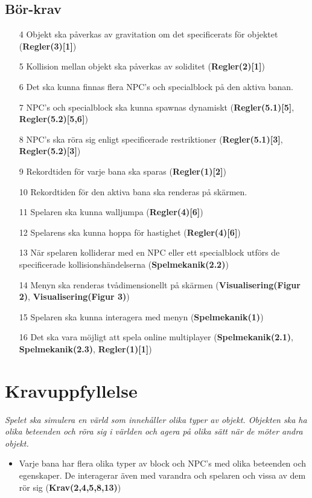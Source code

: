 \documentclass{TDP003mall}
\begin{document}
\subsection{Bör-krav}
\begin{itemize}
\item[4] Objekt ska påverkas av gravitation om det specificerats för objektet (\textbf{Regler(3)[1]})
\item[5] Kollision mellan objekt ska påverkas av soliditet (\textbf{Regler(2)[1]})
\item[6] Det ska kunna finnas flera NPC's och specialblock på den aktiva banan.
\item[7] NPC's och specialblock ska kunna spawnas dynamiskt (\textbf{Regler(5.1)[5]}, \textbf{Regler(5.2)[5,6]})
\item[8] NPC's ska röra sig enligt specificerade restriktioner (\textbf{Regler(5.1)[3]}, \textbf{Regler(5.2)[3]})
\item[9] Rekordtiden för varje bana ska sparas (\textbf{Regler(1)[2]})
\item[10] Rekordtiden för den aktiva bana ska renderas på skärmen.
\item[11] Spelaren ska kunna walljumpa (\textbf{Regler(4)[6]})
\item[12] Spelarens ska kunna hoppa för hastighet (\textbf{Regler(4)[6]})
\item[13] När spelaren kolliderar med en NPC eller ett specialblock utförs de specificerade kollisionshändelserna (\textbf{Spelmekanik(2.2)})
\item[14] Menyn ska renderas tvådimensionellt på skärmen (\textbf{Visualisering(Figur 2)}, \textbf{Visualisering(Figur 3)})
\item[15] Spelaren ska kunna interagera med menyn (\textbf{Spelmekanik(1)})
\item[16] Det ska vara möjligt att spela online multiplayer (\textbf{Spelmekanik(2.1)}, \textbf{Spelmekanik(2.3)}, \textbf{Regler(1)[1]})
\end{itemize}

\section{Kravuppfyllelse}
\textit{Spelet ska simulera en värld som innehåller olika typer av objekt. Objekten ska ha olika beteenden och röra
sig i världen och agera på olika sätt när de möter andra objekt.}
\begin{itemize}
\item Varje bana har flera olika typer av block och NPC's med olika beteenden och egenskaper. De interagerar även med varandra och spelaren och vissa av dem rör sig (\textbf{Krav(2,4,5,8,13)})
\end{itemize}
\end{document}
